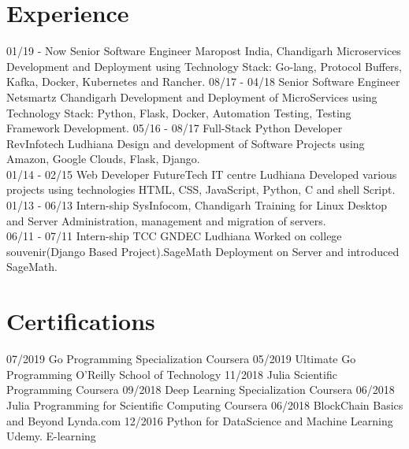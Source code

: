 \documentclass[]{friggeri-cv}
\begin{document}
\section{Experience}
\begin{entrylist}
  \entry
    {01/19 - Now }
    {Senior Software Engineer}
    {Maropost India, Chandigarh}
    {Microservices Development and Deployment using Technology Stack: Go-lang, Protocol Buffers, Kafka, Docker, Kubernetes and Rancher.}
   \entry
    {08/17 - 04/18}
    {Senior Software Engineer}
    {Netsmartz Chandigarh}
    {Development and Deployment of MicroServices using Technology Stack: Python, Flask, Docker, Automation Testing, Testing Framework Development.}
  \entry
    {05/16 - 08/17}
    {Full-Stack Python Developer}
    {RevInfotech Ludhiana}
    {Design and development of Software Projects using Amazon, Google Clouds, Flask, Django.\\}
    \entry
    {01/14 - 02/15}
    {Web Developer}
    {FutureTech IT centre Ludhiana}
    {Developed various projects using technologies HTML, CSS, JavaScript, Python, C and shell Script.\\}
    \entry
    {01/13 - 06/13}
    {Intern-ship}
    {SysInfocom, Chandigarh}
    {Training for Linux Desktop and Server Administration, management and migration of servers.\\}
    \entry
    {06/11 - 07/11}
    {Intern-ship}
    {TCC GNDEC Ludhiana}
    {Worked on college souvenir(Django Based Project).SageMath Deployment on Server and introduced SageMath.\\}
\end{entrylist}
\section{Certifications}
\begin{entrylist}
  \entry
    {07/2019}
    {Go Programming Specialization}
    {Coursera}
    {\emph{}}
  \entry
    {05/2019}
    {Ultimate Go Programming}
    {O'Reilly School of Technology}
    {\emph{}}
  \entry
    {11/2018}
    {Julia Scientific Programming}
    {Coursera}
    {\emph{}}
  \entry
    {09/2018}
    {Deep Learning Specialization}
    {Coursera}
    {\emph{}}
  \entry
    {06/2018}
    {Julia Programming for Scientific Computing}
    {Coursera}
    {\emph{}}
  \entry
    {06/2018}
    {BlockChain Basics and Beyond}
    {Lynda.com}
    {\emph{}}
  \entry
    {12/2016}
    {Python for DataScience and Machine Learning}
    {Udemy. E-learning}
    {\emph{}}
\end{entrylist}
\end{document}
